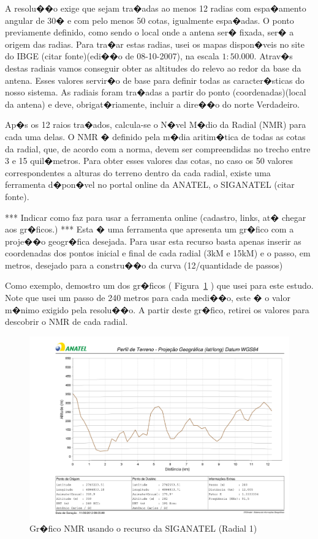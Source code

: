 A resolu��o exige que sejam tra�adas ao menos 12 radias com espa�amento angular de 30� e com pelo menos 50 cotas, igualmente
 espa�adas.
O ponto previamente definido, como sendo o local onde a antena ser� fixada, ser� a origem das radias.
Para tra�ar estas radias, usei os mapas dispon�veis no site do IBGE (citar fonte)(edi��o de 08-10-2007), na escala $1:50.000$.
Atrav�s destas radiais vamos conseguir obter as altitudes do relevo ao redor da base da antena. 
Esses valores servir�o de base para definir todas as caracter�sticas do nosso sistema.
As radiais foram tra�adas a partir do ponto (coordenadas)(local da antena) e deve, obrigat�riamente, incluir a dire��o do norte
 Verdadeiro. 

Ap�s os 12 raios tra�ados, calcula-se o N�vel M�dio da Radial (NMR) para cada uma delas. O NMR � definido pela m�dia aritim�tica
 de todas as cotas da radial, que, de acordo com a norma, devem ser compreendidas no trecho entre 3 e 15 quil�metros.
Para obter esses valores das cotas, no caso os 50 valores correspondentes a alturas do terreno dentro da cada radial, existe uma ferramenta
 d�pon�vel no portal online da ANATEL, o SIGANATEL (citar fonte).

*** Indicar como faz para usar a ferramenta online (cadastro, links, at� chegar aos gr�ficos.) ***
Esta � uma ferramenta que apresenta um gr�fico com a proje��o geogr�fica desejada. Para usar esta recurso basta apenas inserir as coordenadas dos pontos 
inicial e final de cada radial (3kM e 15kM) e o passo, em metros, desejado para a constru��o da curva (12/quantidade de passos)

Como exemplo, demostro um dos gr�ficos ( Figura~\ref{nmt} ) que usei para este estudo. Note que usei um passo de 240 metros para cada 
medi��o, este � o valor m�nimo exigido pela resolu��o. A partir deste gr�fico, retirei os valores para descobrir o NMR de cada radial.


\begin{figure}[!htb]
\centering
\includegraphics[scale=.5]{./figuras/nmt1_v2.pdf} 
\caption{Gr�fico NMR usando o recurso da SIGANATEL (Radial 1)}
\label{nmt}
\end{figure}


